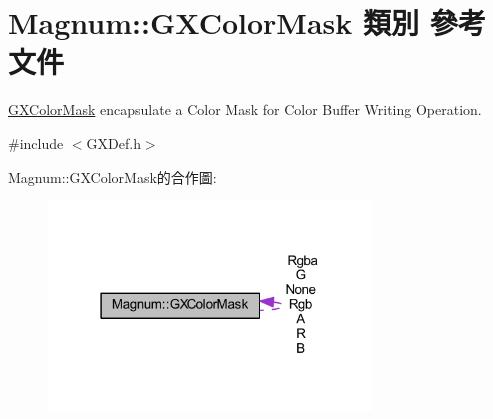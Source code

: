 \hypertarget{class_magnum_1_1_g_x_color_mask}{}\section{Magnum\+:\+:G\+X\+Color\+Mask 類別 參考文件}
\label{class_magnum_1_1_g_x_color_mask}


\hyperlink{class_magnum_1_1_g_x_color_mask}{G\+X\+Color\+Mask} encapsulate a Color Mask for Color Buffer Writing Operation.  




{\ttfamily \#include $<$G\+X\+Def.\+h$>$}



Magnum\+:\+:G\+X\+Color\+Mask的合作圖\+:\nopagebreak
\begin{figure}[H]
\begin{center}
\leavevmode
\includegraphics[width=243pt]{class_magnum_1_1_g_x_color_mask__coll__graph}
\end{center}
\end{figure}

